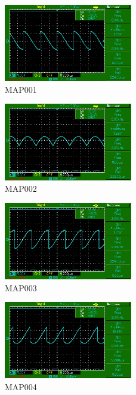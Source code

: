 \begin{figure}
    \centering
    \includegraphics[width=0.5\textwidth]{bilder/MAP001.png}
    \caption{MAP001}        
    \label{fig:MAP001}
\end{figure}

\begin{figure}
    \centering
    \includegraphics[width=0.5\textwidth]{bilder/MAP002.png}
    \caption{MAP002}        
    \label{fig:MAP002}
\end{figure}

\begin{figure}
    \centering
    \includegraphics[width=0.5\textwidth]{bilder/MAP003.png}
    \caption{MAP003}        
    \label{fig:MAP003}
\end{figure}

\begin{figure}
    \centering
    \includegraphics[width=0.5\textwidth]{bilder/MAP004.png}
    \caption{MAP004}        
    \label{fig:MAP004}
\end{figure}

